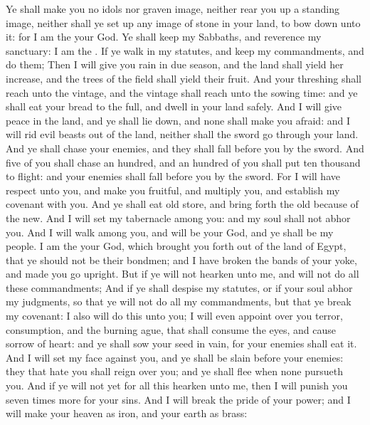 \begin{biblechapter} %
 Ye shall make you no idols nor graven image, neither rear you up a standing image, neither shall ye set up any image of stone in your land, to bow down unto it: for I am the \LORD your God.
\verse Ye shall keep my Sabbaths, and reverence my sanctuary: I am the \LORD.
\verse If ye walk in my statutes, and keep my commandments, and do them;
\verse Then I will give you rain in due season, and the land shall yield her increase, and the trees of the field shall yield their fruit.
\verse And your threshing shall reach unto the vintage, and the vintage shall reach unto the sowing time: and ye shall eat your bread to the full, and dwell in your land safely.
\verse And I will give peace in the land, and ye shall lie down, and none shall make you afraid: and I will rid evil beasts out of the land, neither shall the sword go through your land.
\verse And ye shall chase your enemies, and they shall fall before you by the sword.
\verse And five of you shall chase an hundred, and an hundred of you shall put ten thousand to flight: and your enemies shall fall before you by the sword.
\verse For I will have respect unto you, and make you fruitful, and multiply you, and establish my covenant with you.
\verse And ye shall eat old store, and bring forth the old because of the new.
\verse And I will set my tabernacle among you: and my soul shall not abhor you.
\verse And I will walk among you, and will be your God, and ye shall be my people.
\verse I am the \LORD your God, which brought you forth out of the land of Egypt, that ye should not be their bondmen; and I have broken the bands of your yoke, and made you go upright.
 But if ye will not hearken unto me, and will not do all these commandments;
\verse And if ye shall despise my statutes, or if your soul abhor my judgments, so that ye will not do all my commandments, but that ye break my covenant:
\verse I also will do this unto you; I will even appoint over you terror, consumption, and the burning ague, that shall consume the eyes, and cause sorrow of heart: and ye shall sow your seed in vain, for your enemies shall eat it.
\verse And I will set my face against you, and ye shall be slain before your enemies: they that hate you shall reign over you; and ye shall flee when none pursueth you.
\verse And if ye will not yet for all this hearken unto me, then I will punish you seven times more for your sins.
\verse And I will break the pride of your power; and I will make your heaven as iron, and your earth as brass:

\end{biblechapter}
